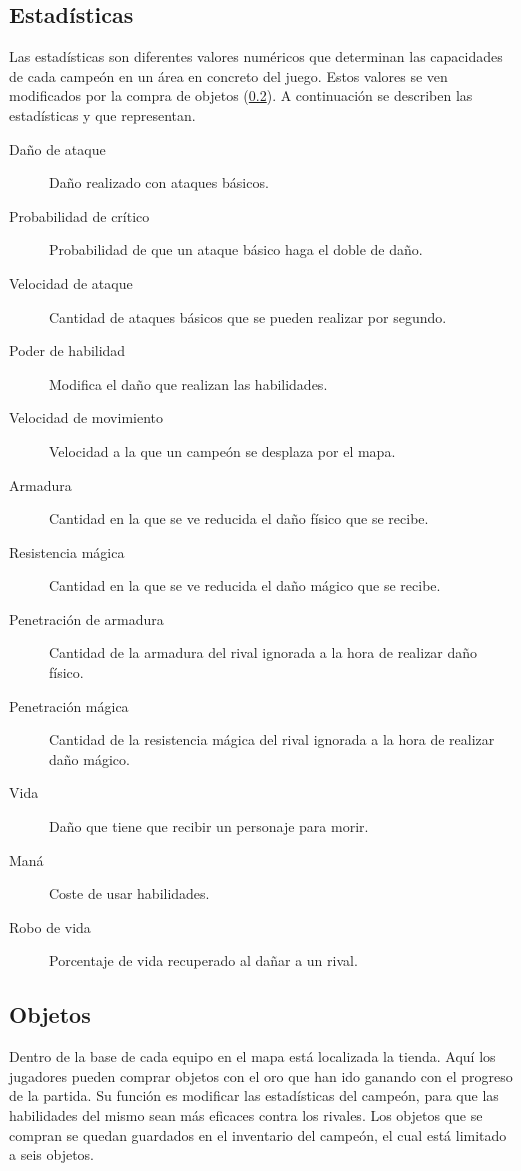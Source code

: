 \subsection{Estadísticas}
\label{estadisticas}
Las estadísticas son diferentes valores numéricos que determinan las capacidades de cada campeón en un área en concreto del juego. Estos valores se ven modificados por la compra de objetos (\ref{objetos}). A continuación se describen las estadísticas y que representan.
\begin{description}
	\item[Daño de ataque] Daño realizado con ataques básicos.
	\item[Probabilidad de crítico] Probabilidad de que un ataque básico haga el doble de daño.
	\item[Velocidad de ataque] Cantidad de ataques básicos que se pueden realizar por segundo.
	\item[Poder de habilidad] Modifica el daño que realizan las habilidades.
	\item[Velocidad de movimiento] Velocidad a la que un campeón se desplaza por el mapa.
	\item[Armadura] Cantidad en la que se ve reducida el daño físico que se recibe.
	\item[Resistencia mágica] Cantidad en la que se ve reducida el daño mágico que se recibe.
	\item[Penetración de armadura] Cantidad de la armadura del rival ignorada a la hora de realizar daño físico.
	\item[Penetración mágica] Cantidad de la resistencia mágica del rival ignorada a la hora de realizar daño mágico.
	\item[Vida] Daño que tiene que recibir un personaje para morir.
	\item[Maná] Coste de usar habilidades.
	\item[Robo de vida] Porcentaje de vida recuperado al dañar a un rival.
\end{description}

\subsection{Objetos}
\label{objetos}
Dentro de la base de cada equipo en el mapa está localizada la tienda. Aquí los jugadores pueden comprar objetos con el oro que han ido ganando con el progreso de la partida. Su función es modificar las estadísticas del campeón, para que las habilidades del mismo sean más eficaces contra los rivales. Los objetos que se compran se quedan guardados en el inventario del campeón, el cual está limitado a seis objetos.

